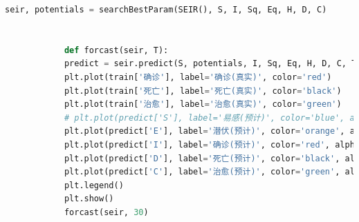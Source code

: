 \documentclass{whutmod}
\begin{document}
\begin{lstlisting}[language=python]
			seir, potentials = searchBestParam(SEIR(), S, I, Sq, Eq, H, D, C)
			
			
			def forcast(seir, T):
			predict = seir.predict(S, potentials, I, Sq, Eq, H, D, C, T)
			plt.plot(train['确诊'], label='确诊(真实)', color='red')
			plt.plot(train['死亡'], label='死亡(真实)', color='black')
			plt.plot(train['治愈'], label='治愈(真实)', color='green')
			# plt.plot(predict['S'], label='易感(预计)', color='blue', alpha=0.5)
			plt.plot(predict['E'], label='潜伏(预计)', color='orange', alpha=0.5)
			plt.plot(predict['I'], label='确诊(预计)', color='red', alpha=0.5)
			plt.plot(predict['D'], label='死亡(预计)', color='black', alpha=0.5)
			plt.plot(predict['C'], label='治愈(预计)', color='green', alpha=0.5)
			plt.legend()
			plt.show()
			forcast(seir, 30)
			\end{lstlisting}
			
\end{document}

